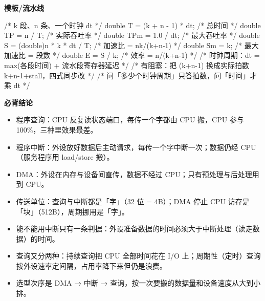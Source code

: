 \documentclass[10pt,a4paper]{ctexart}
\begin{document}

\textbf{模板/流水线}

\begin{codebox}
/* k 段、n 条、一个时钟 dt */
double T   = (k + n - 1) * dt;            /* 总时间             */
double TP  = n / T;                       /* 实际吞吐率         */
double TPm = 1.0 / dt;                    /* 最大吞吐率         */
double S   = (double)n * k * dt / T;      /* 加速比 = nk/(k+n-1) */
double Sm  = k;                           /* 最大加速比 = 段数  */
double E   = S / k;                       /* 效率 = n/(k+n-1)   */
/* 时钟周期：dt = max(各段时间) + 流水段寄存器延迟 */
/* 有阻塞：把 (k+n-1) 换成实际拍数 k+n-1+stall，四式同步改 */
/* 问「多少个时钟周期」只答拍数，问「时间」才乘 dt */
\end{codebox}




\textbf{必背结论}

\begin{itemize}

\item 程序查询：CPU 反复读状态端口，每传一个字都由 CPU 搬，CPU 参与 100\%，三种里效果最差。

\item 程序中断：外设放好数据后主动请求，每传一个字中断一次；数据仍经 CPU（服务程序用 load/store 搬）。

\item DMA：外设在内存与设备间直传，数据不经过 CPU；只有预处理与后处理用到 CPU。

\item 传送单位：查询与中断都是「字」（32 位 = 4B）；DMA 停止 CPU 访存是「块」（512B），周期挪用是「字」。

\item 能不能用中断只有一条判据：外设准备数据的时间必须大于中断处理（读走数据）的时间。

\item 查询又分两种：持续查询把 CPU 全部时间花在 I/O 上；周期性（定时）查询按外设速率定间隔，占用率降下来但仍是浪费。

\item 选型次序是 DMA → 中断 → 查询，按一次要搬的数据量和设备速度从大到小排。

\end{itemize}
\end{document}
